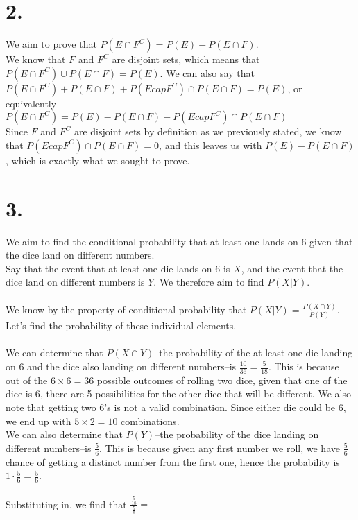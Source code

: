 \documentclass{article}
\begin{document}
\section*{2.}
{\Large

We aim to prove that $P(E \cap F^C) = P(E) - P(E \cap F)$. \\
We know that $F$ and $F^C$ are disjoint sets, which means that $P(E \cap F^C) \cup P(E \cap F) = P(E)$. We can also say that \\ $P(E \cap F^C) + P(E \cap F) + P(E cap F^C) \cap P(E \cap F) = P(E)$, or equivalently \\
$P(E \cap F^C) = P(E) - P(E \cap F) - P(E cap F^C) \cap P(E \cap F)$
\\ Since $F$ and $F^C$ are disjoint sets by definition as we previously stated, we know that $ P(E cap F^C) \cap P(E \cap F) = 0$, and this leaves us with $P(E) - P(E \cap F)$, which is exactly what we sought to prove.

}

\section*{3.}
{\Large 

We aim to find the conditional probability that at least one lands on 6 given that the dice land on different numbers. \\
Say that the event that at least one die lands on 6 is $X$, and the event that the dice land on different numbers is $Y$. We therefore aim to find $P(X|Y)$. \\ \\
We know by the property of conditional probability that $P(X|Y) = \frac{P(X \cap Y)}{P(Y)}$. Let's find the probability of these individual elements. \\ \\ 
We can determine that $P(X \cap Y)$--the probability of the at least one die landing on 6 and the dice also landing on different numbers--is $\frac{10}{36} = \frac{5}{18}$. This is because out of the $6 \times 6 = 36$ possible outcomes of rolling two dice, given that one of the dice is 6, there are 5 possibilities for the other dice that will be different. We also note that getting two 6's is not a valid combination. Since either die could be 6, we end up with $5 \times 2 = 10$ combinations. \\ 
We can also determine that $P(Y)$--the probability of the dice landing on different numbers--is $\frac{5}{6}$. This is because given any first number we roll, we have $\frac{5}{6}$ chance of getting a distinct number from the first one, hence the probability is $1 \cdot \frac{5}{6} = \frac{5}{6}$. \\ \\ 
Substituting in, we find that $\frac{\frac{5}{18}}{\frac{5}{6}} = $ 

}
\end{document}
